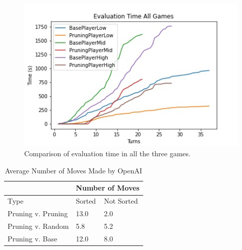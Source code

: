 \documentclass[letterpaper]{article}
\begin{document}
\begin{figure}
    \center

    \includegraphics[scale = 0.4]{all_game_time.jpg}
    
  
    \caption{Comparison of evaluation time in all the three games.}
    \label{timeEval}
\end{figure}

\begin{table}[t]
    \centering
    \caption{Learned Heuristic Weights}
    \label{weights}
\end{table}

\begin{table}[]
\centering
\begin{tabular}{|l|l|l|}
\hline
 & \multicolumn{2}{l|}{Number of Moves} \\ \hline
Type & Sorted & Not Sorted \\ \hline
Pruning v. Pruning & 13.0 & 2.0 \\ \hline
Pruning v. Random & 5.8 & 5.2 \\ \hline
Pruning v. Base & 12.0 & 8.0 \\ \hline
\end{tabular}
\caption{Average Number of Moves Made by OpenAI}
\label{openings}
\end{table}
\end{document}
